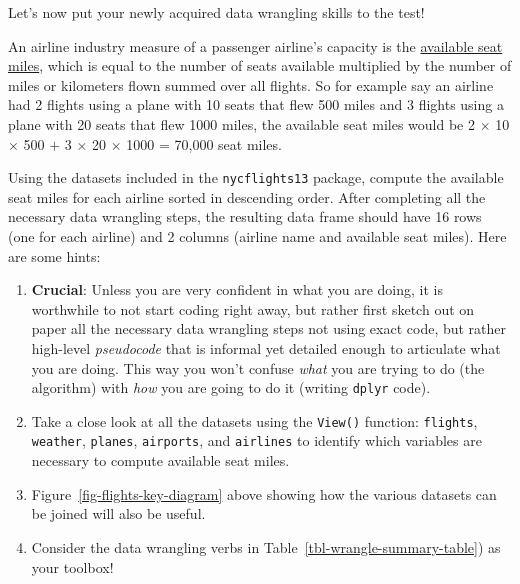 \documentclass[
  letterpaper,
  DIV=11,
  numbers=noendperiod]{scrreprt}
\theoremstyle{definition}
\theoremstyle{remark}
\begin{document}
\begin{tcolorbox}[enhanced jigsaw, coltitle=black, toprule=.15mm, bottomtitle=1mm, breakable, leftrule=.75mm, title={{🎯} Learning Check 3.21}, opacitybacktitle=0.6, colback=white, rightrule=.15mm, opacityback=0, toptitle=1mm, colbacktitle=quarto-callout-tip-color!10!white, colframe=quarto-callout-tip-color-frame, titlerule=0mm, arc=.35mm, bottomrule=.15mm, left=2mm]

Let's now put your newly acquired data wrangling skills to the test!

An airline industry measure of a passenger airline's capacity is the
\href{https://en.wikipedia.org/wiki/Available_seat_miles}{available seat
miles}, which is equal to the number of seats available multiplied by
the number of miles or kilometers flown summed over all flights. So for
example say an airline had 2 flights using a plane with 10 seats that
flew 500 miles and 3 flights using a plane with 20 seats that flew 1000
miles, the available seat miles would be 2 \(\times\) 10 \(\times\) 500
\(+\) 3 \(\times\) 20 \(\times\) 1000 = 70,000 seat miles.

Using the datasets included in the \texttt{nycflights13} package,
compute the available seat miles for each airline sorted in descending
order. After completing all the necessary data wrangling steps, the
resulting data frame should have 16 rows (one for each airline) and 2
columns (airline name and available seat miles). Here are some hints:

\begin{enumerate}
\def\labelenumi{\arabic{enumi}.}
\item
  \textbf{Crucial}: Unless you are very confident in what you are doing,
  it is worthwhile to not start coding right away, but rather first
  sketch out on paper all the necessary data wrangling steps not using
  exact code, but rather high-level \emph{pseudocode} that is informal
  yet detailed enough to articulate what you are doing. This way you
  won't confuse \emph{what} you are trying to do (the algorithm) with
  \emph{how} you are going to do it (writing \texttt{dplyr} code).
\item
  Take a close look at all the datasets using the \texttt{View()}
  function: \texttt{flights}, \texttt{weather}, \texttt{planes},
  \texttt{airports}, and \texttt{airlines} to identify which variables
  are necessary to compute available seat miles.
\item
  Figure~\ref{fig-flights-key-diagram} above showing how the various
  datasets can be joined will also be useful.
\item
  Consider the data wrangling verbs in
  Table~\ref{tbl-wrangle-summary-table}) as your toolbox!
\end{enumerate}

\end{tcolorbox}
\end{document}
